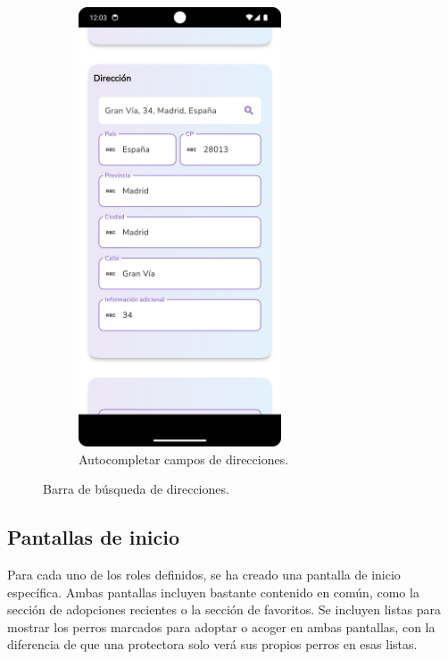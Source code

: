 \documentclass[a4paper, 12pt]{article}
\begin{document}
\begin{figure}[H]
\begin{subfigure}{0.48\textwidth}
\begin{center}
			{\includegraphics[width=6cm]{app/AddressSearcherAutoComplete.png}\par}
			\caption{Autocompletar campos de direcciones.}
		\end{center}  
	\end{subfigure}\hfill
	\caption{Barra de búsqueda de direcciones.}
\end{figure}


\newpage
\subsection*{Pantallas de inicio}

Para cada uno de los roles definidos, se ha creado una pantalla de inicio específica. Ambas pantallas incluyen bastante contenido en común, como la sección de adopciones recientes o la sección de favoritos. Se incluyen listas para mostrar los perros marcados para adoptar o acoger en ambas pantallas, con la diferencia de que una protectora solo verá sus propios perros en esas listas. 
\end{document}
